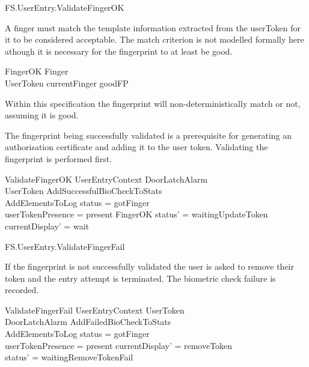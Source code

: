 \begin{traceunit}{FS.UserEntry.ValidateFingerOK}
\end{traceunit}


A finger must match the template information extracted from the
userToken for it to be considered acceptable. The match criterion is
not modelled formally here athough it is necessary for the 
fingerprint to at least be good.

\begin{schema}{FingerOK}
        Finger
\\      UserToken
\where
        currentFinger \in \ran goodFP
\end{schema}

Within this specification the fingerprint will non-deterministically
match or not, assuming it is good.

The fingerprint being successfully validated is a prerequisite for
generating an authorisation certificate and adding it to the user token.
Validating the fingerprint is performed first.

\begin{schema}{ValidateFingerOK}
	UserEntryContext
\also
	\Xi DoorLatchAlarm
\\      \Xi UserToken
\also
        AddSuccessfulBioCheckToStats
\\      AddElementsToLog
\where
	status = gotFinger
\\      userTokenPresence = present
\also
        FingerOK
\also
	status' = waitingUpdateToken
\\	currentDisplay' = wait
\end{schema}


\begin{traceunit}{FS.UserEntry.ValidateFingerFail}
\end{traceunit}


If the fingerprint is not successfully validated the user is asked to
remove their token and the entry attempt is terminated. 
The biometric check failure is recorded.

\begin{schema}{ValidateFingerFail}
        UserEntryContext
\also
	\Xi UserToken
\\      \Xi DoorLatchAlarm
\also      
        AddFailedBioCheckToStats
\\      AddElementsToLog
\where
        status = gotFinger
\\      userTokenPresence = present
\also
        currentDisplay' = removeToken
\\      status' = waitingRemoveTokenFail
\end{schema}

